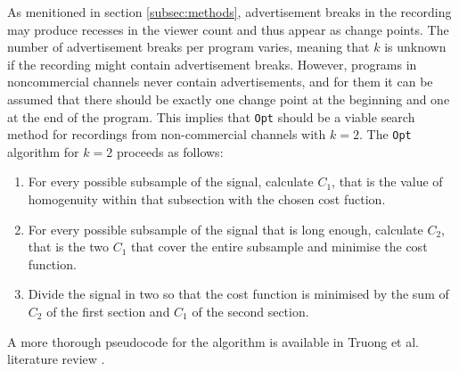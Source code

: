 As menitioned in section \ref{subsec:methods}, advertisement breaks in the recording may produce recesses in the viewer count and thus appear as change points. The number of advertisement breaks per program varies, meaning that $k$ is unknown if the recording might contain advertisement breaks. However, programs in noncommercial channels never contain advertisements, and for them it can be assumed that there should be exactly one change point at the beginning and one at the end of the program. This implies that \texttt{Opt} should be a viable search method for recordings from non-commercial channels with $k=2$.
The \texttt{Opt} algorithm for $k = 2$ proceeds as follows: %
\begin{enumerate}
  \item For every possible subsample of the signal, calculate $C_1$, that is the value of homogenuity within that subsection with the chosen cost fuction.
  \item For every possible subsample of the signal that is long enough, calculate $C_2$, that is the two $C_1$ that cover the entire subsample and minimise the cost function.
  \item Divide the signal in two so that the cost function is minimised by the sum of $C_2$ of the first section and $C_1$ of the second section. 
\end{enumerate}

A more thorough pseudocode for the algorithm is available in Truong et al. literature review \cite{truongSelectiveReviewOffline2020}.

